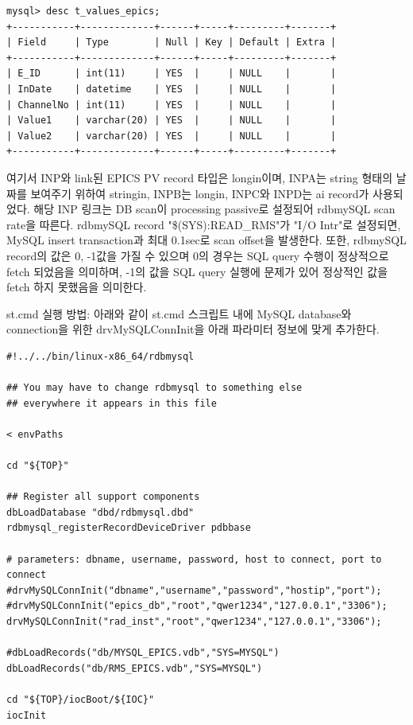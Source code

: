 \documentclass[11pt
  , a4paper
  , article
  , oneside
]{memoir}
\begin{document}
\begin{lstlisting}[style=termstyle]
mysql> desc t_values_epics;
+-----------+-------------+------+-----+---------+-------+
| Field     | Type        | Null | Key | Default | Extra |
+-----------+-------------+------+-----+---------+-------+
| E_ID      | int(11)     | YES  |     | NULL    |       |
| InDate    | datetime    | YES  |     | NULL    |       |
| ChannelNo | int(11)     | YES  |     | NULL    |       |
| Value1    | varchar(20) | YES  |     | NULL    |       |
| Value2    | varchar(20) | YES  |     | NULL    |       |
+-----------+-------------+------+-----+---------+-------+
\end{lstlisting}

여기서 INP와 link된 EPICS PV record 타입은 longin이며, INPA는 string 형태의 날짜를 보여주기 위하여 stringin, INPB는 longin, INPC와 INPD는 ai record가 사용되었다. 해당 INP 링크는 DB scan이 processing passive로 설정되어 rdbmySQL scan rate을 따른다. rdbmySQL record "\$(SYS):READ\_RMS"가 "I/O Intr"로 설정되면, MySQL insert transaction과 최대 0.1sec로 scan offset을 발생한다. 또한, rdbmySQL record의 값은 0, -1값을 가질 수 있으며 0의 경우는 SQL query 수행이 정상적으로 fetch 되었음을 의미하며, -1의 값을 SQL query 실행에 문제가 있어 정상적인 값을 fetch 하지 못했음을 의미한다.

st.cmd 실행 방법:
아래와 같이 st.cmd 스크립트 내에 MySQL database와 connection을 위한 drvMySQLConnInit을 아래 파라미터 정보에 맞게 추가한다.

\begin{lstlisting}[style=termstyle]
#!../../bin/linux-x86_64/rdbmysql

## You may have to change rdbmysql to something else
## everywhere it appears in this file

< envPaths

cd "${TOP}"

## Register all support components
dbLoadDatabase "dbd/rdbmysql.dbd"
rdbmysql_registerRecordDeviceDriver pdbbase

# parameters: dbname, username, password, host to connect, port to connect
#drvMySQLConnInit("dbname","username","password","hostip","port");
#drvMySQLConnInit("epics_db","root","qwer1234","127.0.0.1","3306");
drvMySQLConnInit("rad_inst","root","qwer1234","127.0.0.1","3306");

#dbLoadRecords("db/MYSQL_EPICS.vdb","SYS=MYSQL")
dbLoadRecords("db/RMS_EPICS.vdb","SYS=MYSQL")

cd "${TOP}/iocBoot/${IOC}"
iocInit
\end{lstlisting}
\end{document}
